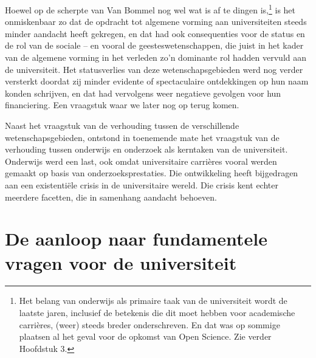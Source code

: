 \documentclass[empirical, authordate, ]{new-jote-article}
\begin{document}
	Hoewel op de scherpte van Van Bommel nog wel wat is af te dingen is,\footnote{Het belang van onderwijs als primaire taak van de universiteit wordt de laatste jaren, inclusief de betekenis die dit moet hebben voor academische carrières, (weer) steeds breder onderschreven. En dat was op sommige plaatsen al het geval voor de opkomst van Open Science. Zie verder Hoofdstuk 3. } is het onmiskenbaar zo dat de opdracht tot algemene vorming aan universiteiten steeds minder aandacht heeft gekregen, en dat had ook consequenties voor de status en de rol van de sociale -- en vooral de geesteswetenschappen, die juist in het kader van de algemene vorming in het verleden zo'n dominante rol hadden vervuld aan de universiteit. Het statusverlies van deze wetenschapsgebieden werd nog verder versterkt doordat zij minder evidente of spectaculaire ontdekkingen op hun naam konden schrijven, en dat had vervolgens weer negatieve gevolgen voor hun financiering. Een vraagstuk waar we later nog op terug komen.



	Naast het vraagstuk van de verhouding tussen de verschillende wetenschapsgebieden, ontstond in toenemende mate het vraagstuk van de verhouding tussen onderwijs en onderzoek als kerntaken van de universiteit. Onderwijs werd een last, ook omdat universitaire carrières vooral werden gemaakt op basis van onderzoeksprestaties. Die ontwikkeling heeft bijgedragen aan een existentiële crisis in de universitaire wereld. Die crisis kent echter meerdere facetten, die in samenhang aandacht behoeven.



	\section{De aanloop naar fundamentele vragen voor de universiteit}
\end{document}
